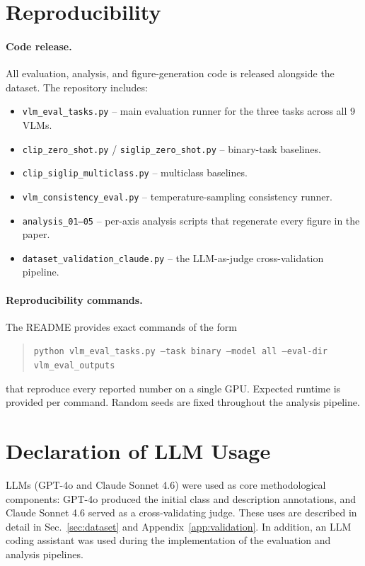 \documentclass{article}
\begin{document}
\section{Reproducibility}
\label{app:reproducibility}

\paragraph{Code release.}
All evaluation, analysis, and figure-generation code is released
alongside the dataset. The repository includes:
\begin{itemize}\setlength{\itemsep}{1pt}
  \item \texttt{vlm\_eval\_tasks.py} -- main evaluation runner for the
        three tasks across all 9 VLMs.
  \item \texttt{clip\_zero\_shot.py} / \texttt{siglip\_zero\_shot.py} --
        binary-task baselines.
  \item \texttt{clip\_siglip\_multiclass.py} -- multiclass baselines.
  \item \texttt{vlm\_consistency\_eval.py} -- temperature-sampling
        consistency runner.
  \item \texttt{analysis\_01--05} -- per-axis analysis scripts that
        regenerate every figure in the paper.
  \item \texttt{dataset\_validation\_claude.py} -- the LLM-as-judge
        cross-validation pipeline.
\end{itemize}

\paragraph{Reproducibility commands.}
The README provides exact commands of the form
\begin{quote}\small\texttt{python vlm\_eval\_tasks.py --task binary
--model all --eval-dir vlm\_eval\_outputs}\end{quote}
that reproduce every reported number on a single GPU. Expected
runtime is provided per command. Random seeds are fixed throughout
the analysis pipeline.

\section{Declaration of LLM Usage}
\label{app:llm_usage}
LLMs (GPT-4o and Claude Sonnet 4.6) were used as core methodological
components: GPT-4o produced the initial class and description
annotations, and Claude Sonnet 4.6 served as a cross-validating
judge. These uses are described in detail in
Sec.~\ref{sec:dataset} and Appendix~\ref{app:validation}. In
addition, an LLM coding assistant was used during the implementation
of the evaluation and analysis pipelines.


\end{document}
